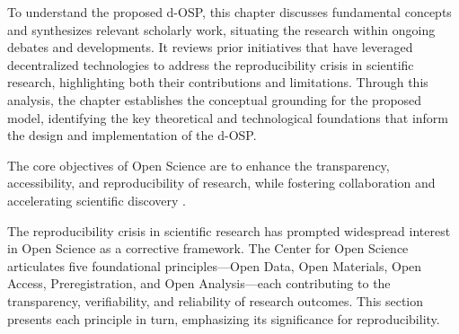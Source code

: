 \documentclass[final]{rc-book-2.14}
\begin{document}
To understand the proposed d-OSP, this chapter discusses fundamental concepts and synthesizes relevant scholarly work, situating the research within ongoing debates and developments. It reviews prior initiatives that have leveraged decentralized technologies to address the reproducibility crisis in scientific research, highlighting both their contributions and limitations. Through this analysis, the chapter establishes the conceptual grounding for the proposed model, identifying the key theoretical and technological foundations that inform the design and implementation of the d-OSP.

The core objectives of Open Science are to enhance the transparency, accessibility, and reproducibility of research, while fostering collaboration and accelerating scientific discovery \cite{Leonelli2016}. 

The reproducibility crisis in scientific research has prompted widespread interest in Open Science as a corrective framework. The Center for Open Science articulates five foundational principles—Open Data, Open Materials, Open Access, Preregistration, and Open Analysis—each contributing to the transparency, verifiability, and reliability of research outcomes. This section presents each principle in turn, emphasizing its significance for reproducibility.
\end{document}
